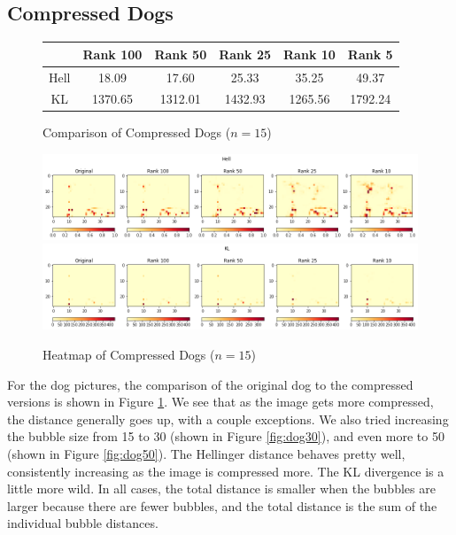 \documentclass{article}
\begin{document}
\subsection{Compressed Dogs}

\begin{figure}[h!]
\begin{center}
\begin{tabular}{ c || c | c | c | c | c }
    & Rank 100 & Rank 50 & Rank 25 & Rank 10 & Rank 5 \\ \hline
    Hell & 18.09 & 17.60 & 25.33 & 35.25 & 49.37 \\
    KL & 1370.65 & 1312.01 & 1432.93 & 1265.56 & 1792.24
\end{tabular}
\caption{Comparison of Compressed Dogs ($n=15$)}
\label{fig:dog15}
\end{center}
\end{figure}

\begin{figure}[h!]
\begin{center}
\includegraphics[width=\textwidth]{hell-dogs-15.png}
\includegraphics[width=\textwidth]{kl-dogs-15.png}
\caption{Heatmap of Compressed Dogs ($n=15$)}
\label{fig:dogheat15}
\end{center}
\end{figure}

For the dog pictures, the comparison of the original dog to the compressed versions is shown in Figure \ref{fig:dog15}. We see that as the image gets more compressed, the distance generally goes up, with a couple exceptions. We also tried increasing the bubble size from 15 to 30 (shown in Figure \ref{fig:dog30}), and even more to 50 (shown in Figure \ref{fig:dog50}). The Hellinger distance behaves pretty well, consistently increasing as the image is compressed more. The KL divergence is a little more wild. In all cases, the total distance is smaller when the bubbles are larger because there are fewer bubbles, and the total distance is the sum of the individual bubble distances.
\end{document}
